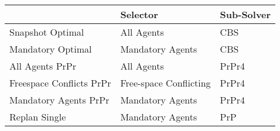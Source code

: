 \begin{tabular}{@{}lll@{}}
\toprule
                         & Selector               & Sub-Solver \\ \midrule
Snapshot Optimal         & All Agents             & CBS        \\
Mandatory Optimal        & Mandatory Agents       & CBS        \\
All Agents PrPr          & All Agents             & PrPr4      \\
Freespace Conflicts PrPr & Free-space Conflicting & PrPr4      \\
Mandatory Agents PrPr    & Mandatory Agents       & PrPr4      \\
Replan Single            & Mandatory Agents       & PrP        \\ \bottomrule
\end{tabular}